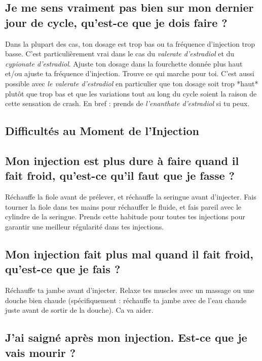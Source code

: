 \documentclass{article}
\begin{document}
\subsection{Je me sens vraiment pas bien sur mon dernier jour de cycle, qu'est-ce que je dois faire ?}\label{7-3}

Dans la plupart des cas, ton dosage est trop bas ou ta fréquence d'injection trop basse. C'est particulièrement vrai dans le cas du \textit{valerate d'estradiol} et du \textit{cypionate d'estradiol}. Ajuste ton dosage dans la fourchette donnée plus haut et/ou ajuste ta fréquence d'injection. Trouve ce qui marche pour toi. C'est aussi possible avec \textit{le valerate d'estradiol} en particulier que ton dosage soit trop *haut* plutôt que trop bas et que les variations tout au long du cycle soient la raison de cette sensation de crash. En bref : prends de \textit{l'enanthate d'estradiol} si tu peux.

\subsection*{Difficultés au Moment de l'Injection}

\subsection{Mon injection est plus dure à faire quand il fait froid, qu'est-ce qu'il faut que je fasse ?}

Réchauffe la fiole avant de prélever, et réchauffe la seringue avant d'injecter. Fais tourner la fiole dans tes mains pour réchauffer le fluide, et fais pareil avec le cylindre de la seringue. Prends cette habitude pour toutes tes injections pour garantir une meilleur régularité dans tes injections.

\subsection{Mon injection fait plus mal quand il fait froid, qu'est-ce que je fais ?}

Réchauffe ta jambe avant d'injecter. Relaxe tes muscles avec un massage ou une douche bien chaude (spécifiquement : réchauffe ta jambe avec de l'eau chaude juste avant de sortir de la douche). Ca va aider.

\subsection{J'ai saigné après mon injection. Est-ce que je vais mourir ?}
\end{document}
